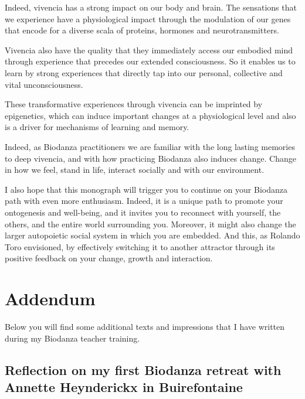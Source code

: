 \documentclass[
  11pt,
]{book}
\begin{document}
Indeed, vivencia has a strong impact on our body and brain. The sensations that we experience have a physiological impact through the modulation of our genes that encode for a diverse scala of proteins, hormones and neurotransmitters.

Vivencia also have the quality that they immediately access our embodied mind through experience that precedes our extended consciousness. So it enables us to learn by strong experiences that directly tap into our personal, collective and vital unconsciousness.

These transformative experiences through vivencia can be imprinted by epigenetics, which can induce important changes at a physiological level and also is a driver for mechanisms of learning and memory.

Indeed, as Biodanza practitioners we are familiar with the long lasting memories to deep vivencia, and with how practicing Biodanza also induces change.
Change in how we feel, stand in life, interact socially and with our environment.

I also hope that this monograph will trigger you to continue on your Biodanza path with even more enthusiasm. Indeed, it is a unique path to promote your ontogenesis and well-being, and it invites you to reconnect with yourself, the others, and the entire world surrounding you. Moreover, it might also change the larger autopoietic social system in which you are embedded. And this, as Rolando Toro envisioned, by effectively switching it to another attractor through its positive feedback on your change, growth and interaction.

\hypertarget{addendum}{%
\chapter*{Addendum}\label{addendum}}

Below you will find some additional texts and impressions that I have written during my Biodanza teacher training.

\hypertarget{reflection-on-my-first-biodanza-retreat-with-annette-heynderickx-in-buirefontaine}{%
\section*{Reflection on my first Biodanza retreat with Annette Heynderickx in Buirefontaine}\label{reflection-on-my-first-biodanza-retreat-with-annette-heynderickx-in-buirefontaine}}
\end{document}

